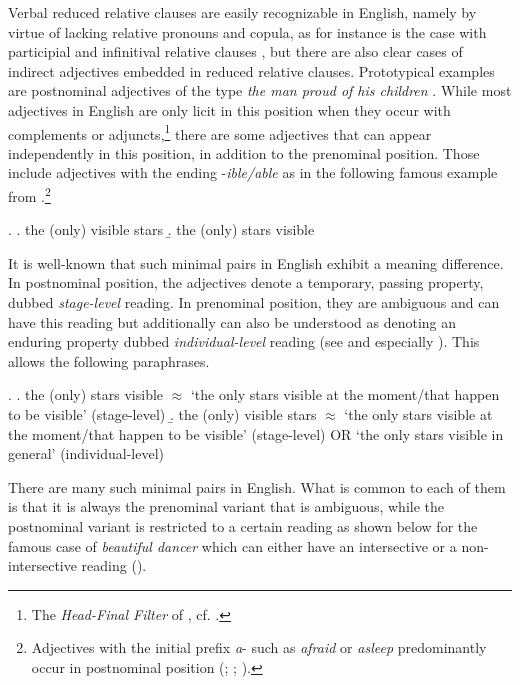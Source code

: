 Verbal reduced relative clauses are easily recognizable in  English, namely by virtue of lacking relative pronouns and copula, as for instance is the case with participial and infinitival relative clauses \citep{kayne:1994:anti, cinque:2020:relcl}, but there are also clear cases of indirect adjectives embedded in reduced relative clauses. Prototypical examples are postnominal adjectives of the type \textit{the man proud of his children} \citep{williams:1982:fofc, kayne:1994:anti, sadler:1994:prenominal, larson:2000:acd, larson:2004:indefinite}. While most adjectives in English are only licit in this position when they occur with complements or adjuncts,\footnote{The \textit{Head-Final Filter} of \citet{williams:1982:fofc}, cf. \citet{alexeyenko:2021:hff, richards:2022:finding, richards:2023:finding}.} there are some adjectives that can appear independently in this position, in addition to the prenominal position. Those include adjectives with the ending -\textit{ible/able} as in the following famous example from \citet[3--4]{bolinger:1967:adj}.\footnote{Adjectives with the initial prefix \textit{a}- such as \textit{afraid} or \textit{asleep} predominantly occur in postnominal position (\citealt{bolinger:1967:adj, larson:1998:events, larson:2004:indefinite}; \citealt[295]{alex:2007:nounphrase}; \citealt[§ 2.3]{belk:2017:attributes}).}

\ex. \a. the (only) visible stars
\b. the (only) stars visible

It is well-known that such minimal pairs in English exhibit a meaning difference. In postnominal position, the adjectives denote a temporary, passing property, dubbed \textit{stage-level} reading. In prenominal position, they are ambiguous and can have this reading but additionally can also be understood as denoting an enduring property dubbed \textit{individual-level} reading (see \citealt{sadler:1994:prenominal, larson:1998:events, larson:2004:indefinite} and especially \citealt[§ 2.1]{cinque:2010:adj}). This allows the following paraphrases.

\ex. \a. the (only) stars visible $\approx$ `the only stars visible at the moment/that happen to be visible' (stage-level)
\b. the (only) visible stars $\approx$ `the only stars visible at the moment/that happen to be visible' (stage-level) OR `the only stars visible in general' (individual-level)

There are many such minimal pairs in English. What is common to each of them is that it is always the prenominal variant that is ambiguous, while the postnominal variant is restricted to a certain reading as shown below for the famous case of \textit{beautiful dancer} which can either have an intersective or a non-intersective reading (\citealt{larson:2000:acd, vendler:1957:verbs, siegel:1976:capturing, larson:1995:olga}). 

